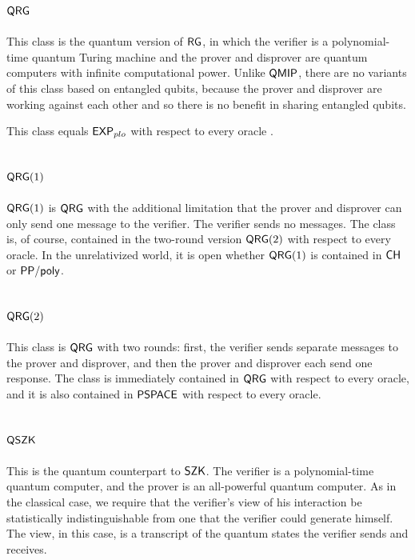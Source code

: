 \subsection{$\mathsf{QRG}$}

This class is the quantum version of $\mathsf{RG}$, in which the verifier is a 
polynomial-time quantum Turing machine and the prover and disprover are quantum 
computers with infinite computational power. Unlike $\mathsf{QMIP}$, there are no 
variants of this class based on entangled qubits, because the prover and 
disprover are working against each other and so there is no benefit in sharing 
entangled qubits.

This class equals $\mathsf{EXP}_{plo}$ with respect to every oracle 
\cite{gutoski2007toward}.

\subsection{$\mathsf{QRG}(1)$}

$\mathsf{QRG}(1)$ is $\mathsf{QRG}$ with the additional limitation that the prover and
disprover can only send one message to the verifier. The verifier sends no 
messages. The class is, of course, contained in the two-round version 
$\mathsf{QRG}(2)$ with respect to every oracle. In the unrelativized world, it is 
open whether $\mathsf{QRG}(1)$ is contained in $\mathsf{CH}$ or $\mathsf{PP}/\mathsf{poly}$.

\subsection{$\mathsf{QRG}(2)$}

This class is $\mathsf{QRG}$ with two rounds: first, the verifier sends separate messages to the prover and disprover, and then the prover and disprover each send one response. The class is immediately contained in $\mathsf{QRG}$ with respect to 
every oracle, and it is also contained in $\mathsf{PSPACE}$ with respect to every
oracle.

\subsection{$\mathsf{QSZK}$}

This is the quantum counterpart to $\mathsf{SZK}$. The verifier is a 
polynomial-time quantum computer, and the prover is an all-powerful quantum 
computer. As in the classical case, we require that the verifier's view of his 
interaction be statistically indistinguishable from one that the verifier 
could generate himself. The view, in this case, is a transcript of the quantum
states the verifier sends and receives.

